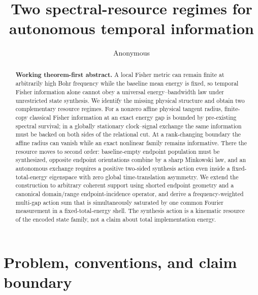 \documentclass[aps,pra,preprint,nofootinbib]{revtex4-2}
\begin{document}
\title{Two spectral-resource regimes for autonomous temporal information}

\author{Anonymous}

\begin{abstract}
\textbf{Working theorem-first abstract.}
A local Fisher metric can remain finite at arbitrarily high Bohr frequency while the baseline mean energy is fixed, so temporal Fisher information alone cannot obey a universal energy--bandwidth law under unrestricted state synthesis.  We identify the missing physical structure and obtain two complementary resource regimes.  For a nonzero affine physical tangent radius, finite-copy classical Fisher information at an exact energy gap is bounded by pre-existing spectral survival; in a globally stationary clock--signal exchange the same information must be backed on both sides of the relational cut.  At a rank-changing boundary the affine radius can vanish while an exact nonlinear family remains informative.  There the resource moves to second order: baseline-empty endpoint population must be synthesized, opposite endpoint orientations combine by a sharp Minkowski law, and an autonomous exchange requires a positive two-sided synthesis action even inside a fixed-total-energy eigenspace with zero global time-translation asymmetry.  We extend the construction to arbitrary coherent support using shorted endpoint geometry and a canonical domain/range endpoint-incidence operator, and derive a frequency-weighted multi-gap action sum that is simultaneously saturated by one common Fourier measurement in a fixed-total-energy shell.  The synthesis action is a kinematic resource of the encoded state family, not a claim about total implementation energy.
\end{abstract}

\maketitle


\section{Problem, conventions, and claim boundary}
\label{sec:model}
\end{document}
